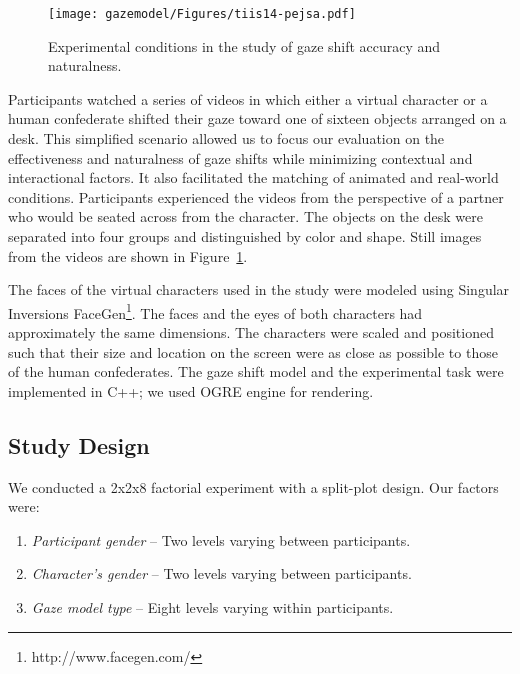 \begin{figure}
  \centering
  \texttt{[image: gazemodel/Figures/tiis14-pejsa.pdf]}
  \caption{Experimental conditions in the study of gaze shift accuracy and naturalness.}
  \label{fig:ModelEvalSetup}
\end{figure}

Participants watched a series of videos in which either a virtual character or a human confederate shifted their gaze toward one of sixteen objects arranged on a desk. This simplified scenario allowed us to focus our evaluation on the effectiveness and naturalness of gaze shifts while minimizing contextual and interactional factors. It also facilitated the matching of animated and real-world conditions. Participants experienced the videos from the perspective of a partner who would be seated across from the character. The objects on the desk were separated into four groups and distinguished by color and shape. Still images from the videos are shown in Figure~\ref{fig:ModelEvalSetup}.

The faces of the virtual characters used in the study were modeled using Singular Inversions FaceGen\footnote{http://www.facegen.com/}. The faces and the eyes of both characters had approximately the same dimensions. The characters were scaled and positioned such that their size and location on the screen were as close as possible to those of the human confederates. The gaze shift model and the experimental task were implemented in C++; we used OGRE engine for rendering.

\subsection{Study Design}

We conducted a 2x2x8 factorial experiment with a split-plot design. Our factors were:

\begin{enumerate}
\item \emph{Participant gender} -- Two levels varying between participants.
\item \emph{Character's gender} -- Two levels varying between participants.
\item \emph{Gaze model type} -- Eight levels varying within participants.
\end{enumerate}

